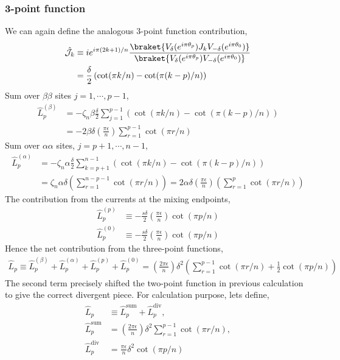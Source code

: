 \documentclass[11pt]{article}
\newcommand{\ep}{\epsilon}
\newcommand{\lb}{\left(}
\newcommand{\rb}{\right)}
\begin{document}
\subsubsection{3-point function}
We can again define the analogous 3-point function contribution,
\begin{align}
    \hat{\mathcal{J}}_k &\equiv ie^{i\pi (2k+1)/n}  \frac{\braket{V_{\delta}(e^{i\pi \theta_{p}})J_k V_{-\delta}(e^{i\pi \theta_{0}})}}{\braket{V_{\delta}(e^{i\pi \theta_{p}})V_{-\delta}(e^{i\pi \theta_{0}})}} \\
    &= \frac{\delta}{2} \lb \cot(\pi k/n) - \cot(\pi (k-p)/n) \rb
\end{align}
Sum over $\beta\beta$ sites $j = 1,\cdots, p-1$,
\begin{align}
    \hat{L}_p^{(\beta)} &= -\zeta_n\beta\frac{\delta}{2}\sum_{j=1}^{p-1} \lb \cot(\pi k/n) - \cot(\pi (k-p)/n) \rb \\
    &= -2\beta \delta \lb\frac{\pi \ep}{n}\rb\sum_{r=1}^{p-1}\cot(\pi r/n)
\end{align}
Sum over $\alpha \alpha$ sites, $j = p+1,\cdots, n-1$,
\begin{align}
    \hat{L}^{(\alpha)}_p &= -\zeta_n \alpha \frac{\delta}{2}\sum_{k=p+1}^{n-1}\lb\cot(\pi k/n) - \cot(\pi(k-p)/n)  \rb \\
    &=\zeta_n\alpha\delta \lb  \sum_{r=1}^{n-p-1} \cot(\pi r/n)  \rb = 2\alpha\delta \lb\frac{\pi \ep}{n}\rb \lb\sum_{r=1}^{p}\cot(\pi r/n)\rb
\end{align}
The contribution from the currents at the mixing endpoints,
\begin{align}
    \hat{L}_p^{(p)} &\equiv -\frac{s\delta}{2}\lb\frac{\pi \ep}{n}\rb\cot(\pi p/n) \\
    \hat{L}_p^{(0)} &\equiv -\frac{s\delta}{2}\lb\frac{\pi \ep}{n}\rb\cot(\pi p/n) 
\end{align}
Hence the net contribution from the three-point functions,
\begin{align}
    \hat{L}_p \equiv \hat{L}_p^{(\beta)} + \hat{L}_p^{(\alpha)} + \hat{L}_p^{(p)} + \hat{L}_p^{(0)} = \lb\frac{2\pi \ep}{n}\rb \delta^2  \lb \sum_{r=1}^{p-1}\cot(\pi r/n) + \frac{1}{2}\cot(\pi p/n) \rb
\end{align}
The second term precisely shifted the two-point function in previous calculation to give the correct divergent piece. For calculation purpose, lets define,
\begin{align}\label{eq: 3 point function coherent states mixture}
     \hat{L}_p &\equiv  \hat{L}_p^{\text{sum}} + \hat{L}_p^{\text{div}},
     \\
     \hat{L}_p^{\text{sum}} &= \lb\frac{2\pi \ep}{n}\rb \delta^2   \sum_{r=1}^{p-1}\cot(\pi r/n) ,\\
     \hat{L}_p^{\text{div}} &= \frac{\pi \ep}{n}\delta^2\cot(\pi p/n)
\end{align}
\end{document}
